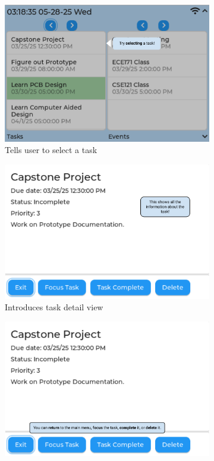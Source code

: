 \documentclass{article}
\begin{document}
\begin{figure}[h]
\begin{subfigure}{0.5\textwidth}
        \includegraphics[width = \textwidth]{task_select.png}
        \caption{Tells user to select a task}
    \end{subfigure}
    \begin{subfigure}{0.5\textwidth}
        \includegraphics[width = \textwidth]{task_detail.png}
        \caption{Introduces task detail view}
    \end{subfigure}
    \begin{subfigure}{0.5\textwidth}
        \includegraphics[width = \textwidth]{task_buttons.png}

\end{subfigure}
\end{figure}
\end{document}
